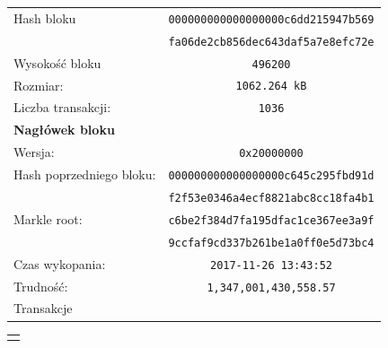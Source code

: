 \documentclass[12pt, twoside, final, openany]{mgr}
\begin{document}
\begin{figure}[H]
	\begin{center}	
	\begin{tabular}{ | l  c | }
		\hline    
     	Hash bloku & \texttt{000000000000000000c6dd215947b569} \\
    			    & \texttt{fa06de2cb856dec643daf5a7e8efc72e} \\ 
    	Wysokość bloku & \texttt{496200} \\
    	Rozmiar: & \texttt{1062.264 kB} \\
		Liczba transakcji: & \texttt{1036}\\ \hline
		\textbf{Nagłówek bloku} & \\
   	 	Wersja: & \texttt{0x20000000} \\   	 
   	 	Hash poprzedniego bloku: & \texttt{000000000000000000c645c295fbd91d}\\
   	 							 & \texttt{f2f53e0346a4ecf8821abc8cc18fa4b1}\\
		Markle root: 			 & \texttt{c6be2f384d7fa195dfac1ce367ee3a9f}\\
								 & \texttt{9ccfaf9cd337b261be1a0ff0e5d73bc4}\\
   		Czas wykopania: & \texttt{2017-11-26 13:43:52}\\
   		Trudność: & \texttt{1,347,001,430,558.57}\\
   		\hline
   		Transakcje &\\
   		\hline 
 	\end{tabular}
 	\end{center}

	\begin{center}
	\begin{tabular}{c}
		\big\Downarrow
	\end{tabular}
	\end{center} 	


\end{figure}
\end{document}
